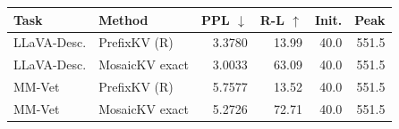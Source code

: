 \begin{tabular}{llrrrr}
\toprule
Task & Method & PPL $\downarrow$ & R-L $\uparrow$ & Init. & Peak\\\midrule
LLaVA-Desc. & PrefixKV (R) & 3.3780 & 13.99 & 40.0 & 551.5\\
LLaVA-Desc. & MosaicKV exact & 3.0033 & 63.09 & 40.0 & 551.5\\
MM-Vet & PrefixKV (R) & 5.7577 & 13.52 & 40.0 & 551.5\\
MM-Vet & MosaicKV exact & 5.2726 & 72.71 & 40.0 & 551.5\\
\bottomrule
\end{tabular}
